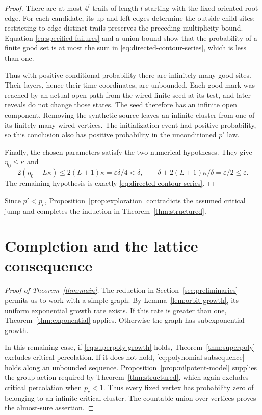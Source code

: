 \documentclass[11pt]{article}
\theoremstyle{definition}
\newcommand{\pc}{p_c}
\begin{document}
\begin{proof}
There are at most $4^l$ trails of length $l$ starting with the fixed
oriented root edge. For each candidate, its up and left edges
determine the outside child sites; restricting to edge-distinct
trails preserves the preceding multiplicity bound. Equation
\eqref{eq:specified-failures} and a union bound show that the
probability of a finite good set is at most the sum in
\eqref{eq:directed-contour-series}, which is less than one.

Thus with positive conditional probability there are infinitely
many good sites. Their layers, hence their time coordinates, are
unbounded. Each good mark was reached by an actual open path from
the wired finite seed at its test, and later reveals do not change
those states. The seed therefore has an infinite open component.
Removing the synthetic source leaves an infinite cluster from one
of its finitely many wired vertices. The initialization event had
positive probability, so this conclusion also has positive
probability in the unconditioned $p'$ law.

Finally, the chosen parameters satisfy the two numerical hypotheses.
They give $\eta_0\le\kappa$ and
\[
 2(\eta_0+L\kappa)\le2(L+1)\kappa
   =\varepsilon\delta/4<\delta,
 \qquad
 \delta+2(L+1)\kappa/\delta=\varepsilon/2\le\varepsilon.
\]
The remaining hypothesis is exactly
\eqref{eq:directed-contour-series}.
\end{proof}

Since $p'<\pc$, Proposition~\ref{prop:exploration} contradicts the
assumed critical jump and completes the induction in
Theorem~\ref{thm:structured}.

\section{Completion and the lattice consequence}
\label{sec:completion}

\begin{proof}[Proof of Theorem~\ref{thm:main}]
The reduction in Section~\ref{sec:preliminaries} permits us to work
with a simple graph. By Lemma~\ref{lem:orbit-growth}, its uniform
exponential growth rate exists. If this rate is greater than one,
Theorem~\ref{thm:exponential} applies. Otherwise the graph has
subexponential growth.

In this remaining case, if \eqref{eq:superpoly-growth} holds,
Theorem~\ref{thm:superpoly} excludes critical percolation. If it does
not hold, \eqref{eq:polynomial-subsequence} holds along an unbounded
sequence. Proposition~\ref{prop:nilpotent-model} supplies the group
action required by Theorem~\ref{thm:structured}, which again excludes
critical percolation when $\pc<1$. Thus every fixed vertex has
probability zero of belonging to an infinite critical cluster.
The countable union over vertices proves the almost-sure assertion.
\end{proof}
\end{document}
